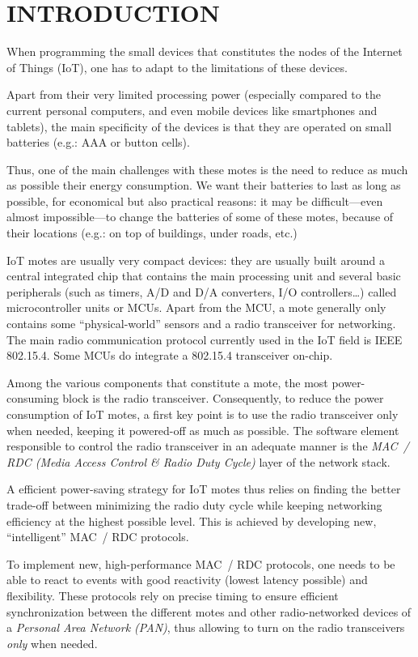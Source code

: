 \documentclass[a4paper,twoside]{article}
\begin{document}
\section{\uppercase{Introduction}}

When programming the small devices that constitutes the nodes of
the Internet of Things (IoT), one has to adapt to the limitations of
these devices.

Apart from their very limited processing power (especially compared to
the current personal computers, and even mobile devices like smartphones
and tablets), the main specificity of the devices is that they are operated
on small batteries (e.g.: AAA or button cells).

Thus, one of the main challenges with these motes is the need to reduce
as much as possible their energy consumption. We want their batteries to last
as long as possible, for economical but also practical reasons: it may be
difficult---even almost impossible---to change the batteries of some of these
motes, because of their locations (e.g.: on top of buildings, under roads,
etc.)

IoT motes are usually very compact devices: they are usually built around
a central integrated chip that contains the main processing unit and several
basic peripherals (such as timers, A/D and D/A converters, I/O
controllers\ldots) called microcontroller units or MCUs. Apart from the MCU,
a mote generally only contains some ``physical-world'' sensors and a radio
transceiver for networking. The main radio communication protocol currently
used in the IoT field is IEEE 802.15.4. Some MCUs do integrate a 802.15.4
transceiver on-chip.

Among the various components that constitute a mote, the most power-consuming
block is the radio transceiver. Consequently, to reduce the power consumption
of IoT motes, a first key point is to use the radio transceiver only when
needed, keeping it powered-off as much as possible. The software element
responsible to control the radio transceiver in an adequate manner is
the \emph{MAC~/ RDC (Media Access Control \& Radio Duty Cycle)}
layer of the network stack.

A efficient power-saving strategy for IoT motes thus relies on finding the
better trade-off between minimizing the radio duty cycle while keeping
networking efficiency at the highest possible level. This is achieved
by developing new, ``intelligent'' MAC~/ RDC protocols.

To implement new, high-performance MAC~/ RDC protocols, one needs to be
able to react to events with good reactivity (lowest latency possible) and
flexibility. These protocols rely on precise timing to ensure efficient
synchronization between the different motes and other radio-networked
devices of a \emph{Personal Area Network (PAN)}, thus allowing
to turn on the radio transceivers \emph{only} when needed.
\end{document}
